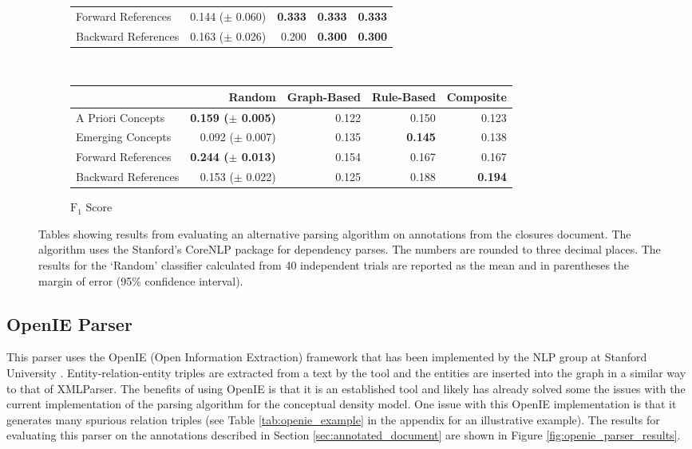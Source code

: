 \documentclass[12pt]{article}
\theoremstyle{grammarstyle}
\begin{document}
\begin{figure}[h]
\begin{subfigure}[b]{\textwidth}
\begin{tabular}{|l|r|r|r|r|}
            \hline
            Forward References & 0.144 ($\pm$ 0.060) &        \textbf{0.333} &       \textbf{0.333} &      \textbf{0.333} \\
            Backward References & 0.163 ($\pm$ 0.026) & 0.200 &       \textbf{0.300} &      \textbf{0.300} \\
            \hline
        \end{tabular}
    \end{subfigure} \\
    \begin{subfigure}[b]{\textwidth}
        \caption{$\text{F}_1$ Score}
        \label{fig:corenlp_f1_score}
        \centering
        \begin{tabular}{|l|r|r|r|r|}
            \hline
            {} & Random & Graph-Based & Rule-Based & Composite \\
            \hline
            A Priori Concepts &  \textbf{0.159 ($\pm$ 0.005)} & 0.122 & 0.150 & 0.123 \\
            Emerging Concepts & 0.092 ($\pm$ 0.007) & 0.135 &       \textbf{0.145} & 0.138 \\
            \hline
            Forward References &  \textbf{0.244 ($\pm$ 0.013)} & 0.154 & 0.167 & 0.167 \\
            Backward References & 0.153 ($\pm$ 0.022) & 0.125 & 0.188 &      \textbf{0.194} \\
            \hline
        \end{tabular}
    \end{subfigure}
    \caption{Tables showing results from evaluating an alternative parsing algorithm on annotations from the closures document. The algorithm uses the Stanford's CoreNLP package for dependency parses. The numbers are rounded to three decimal places. The results for the `Random' classifier calculated from 40 independent trials are reported as the mean and in parentheses the margin of error (95\% confidence interval).}
    \label{fig:corenlp_parser_results}
\end{figure}

\subsection{OpenIE Parser}
This parser uses the OpenIE (Open Information Extraction) framework that has been implemented by the NLP group at Stanford University \citep{manning-EtAl:2014:P14-5, angeli2015leveraging}.
Entity-relation-entity triples are extracted from a text by the tool and the entities are inserted into the graph in a similar way to that of XMLParser. The benefits of using OpenIE is that it is an established tool and likely has already solved some the issues with the current implementation of the parsing algorithm for the conceptual density model. One issue with this OpenIE implementation is that it generates many spurious relation triples (see Table \ref{tab:openie_example} in the appendix for an illustrative example).
The results for evaluating this parser on the annotations described in Section \ref{sec:annotated_document} are shown in Figure \ref{fig:openie_parser_results}.
\end{document}
